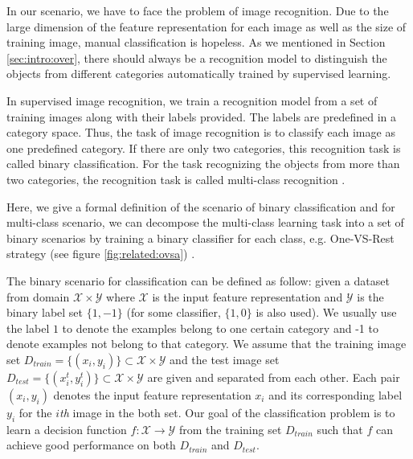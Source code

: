 In our scenario, we have to face the problem of image recognition. Due to the large dimension of the feature representation for each image as well as the size of training image, manual classification is hopeless. As we mentioned in Section \ref{sec:intro:over}, there should always be a recognition model to distinguish the objects from different categories automatically trained by supervised learning. 

In supervised image recognition, we train a recognition model from a set of training images along with their labels provided. The labels are predefined in a category space. Thus, the task of image recognition is to classify each image as one predefined category. If there are only two categories, this recognition task is called binary classification. For the task recognizing the objects from more than two categories, the recognition task is called multi-class recognition \cite{aytar2011tabula} \cite{krizhevsky2012imagenet}.  

Here, we give a formal definition of the scenario of binary classification and for multi-class scenario, we can decompose the multi-class learning task into a set of binary scenarios by training a binary classifier for each class, e.g. One-VS-Rest strategy (see figure \ref{fig:related:ovsa})\cite{rifkin2004defense} \cite{tsoumakas2006multi}.

The binary scenario for classification can be defined as follow: given a dataset from domain $\mathcal{X} \times \mathcal{Y}$ where $\mathcal{X}$ is the input feature representation and $\mathcal{Y}$ is the binary label set $\{1,-1\}$ (for some classifier, $\{1,0\}$ is also used). We usually use the label $1$ to denote the examples belong to one certain category and -1 to denote examples not belong to that category. 
We assume that the training image set $D_{train}=\{(x_i,y_i)\} \subset \mathcal{X} \times \mathcal{Y}$ and the test image set $D_{test}=\{(x^t_i,y^t_i)\}\subset \mathcal{X} \times \mathcal{Y}$ are given and separated from each other. Each pair $(x_i,y_i)$ denotes the input feature representation $x_i$ and its corresponding label $y_i$ for the $i$\textit{th} image in the both set. Our goal of the classification problem is to learn a decision function $f:\mathcal{X} \rightarrow \mathcal{Y}$ from the training set $D_{train}$ such that $f$ can achieve good performance on both $D_{train}$ and $D_{test}$. 

